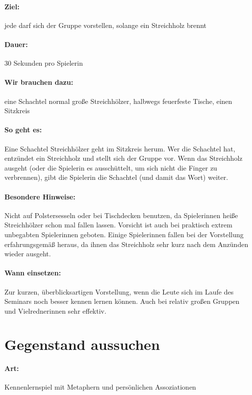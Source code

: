 \paragraph{Ziel:} jede darf sich der Gruppe vorstellen, solange ein Streichholz brennt
\paragraph{Dauer:} 30 Sekunden pro Spielerin
\paragraph{Wir brauchen dazu:} eine Schachtel normal große Streichhölzer, halbwegs feuerfeste Tische, einen Sitzkreis
\paragraph{So geht es:} Eine Schachtel Streichhölzer geht im Sitzkreis herum. Wer die Schachtel hat, entzündet ein Streichholz und stellt sich der Gruppe vor. Wenn das Streichholz ausgeht (oder die Spielerin es ausschüttelt, um sich nicht die Finger zu verbrennen), gibt die Spielerin die Schachtel (und damit das Wort) weiter.
\paragraph{Besondere Hinweise:} Nicht auf Polstersesseln oder bei Tischdecken benutzen, da Spielerinnen heiße Streichhölzer schon mal fallen lassen. Vorsicht ist auch bei praktisch extrem unbegabten Spielerinnen geboten. Einige Spielerinnen fallen bei der Vorstellung erfahrungsgemäß heraus, da ihnen das Streichholz sehr kurz nach dem Anzünden wieder ausgeht.
\paragraph{Wann einsetzen:} Zur kurzen, überblicksartigen Vorstellung, wenn die Leute sich im Laufe des Seminars noch besser kennen lernen können. Auch bei relativ großen Gruppen und Vielrednerinnen sehr effektiv.

\section{Gegenstand aussuchen}
\paragraph{Art:} Kennenlernspiel mit Metaphern und persönlichen Assoziationen
